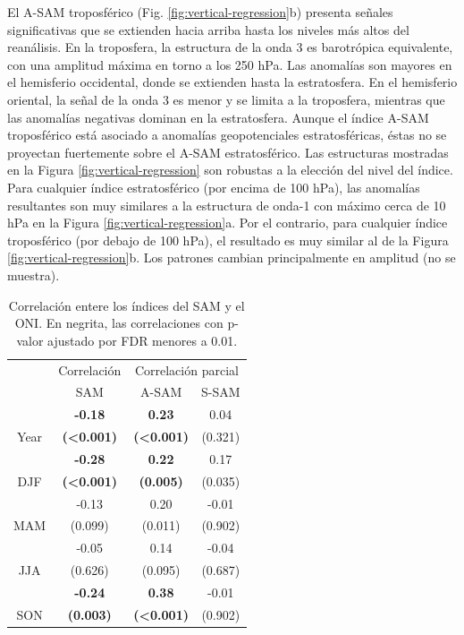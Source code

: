 \documentclass[12pt,oneside]{reedthesis}
\begin{document}
El A-SAM troposférico (Fig. \ref{fig:vertical-regression}b) presenta señales significativas que se extienden hacia arriba hasta los niveles más altos del reanálisis.
En la troposfera, la estructura de la onda 3 es barotrópica equivalente, con una amplitud máxima en torno a los 250 hPa.
Las anomalías son mayores en el hemisferio occidental, donde se extienden hasta la estratosfera.
En el hemisferio oriental, la señal de la onda 3 es menor y se limita a la troposfera, mientras que las anomalías negativas dominan en la estratosfera.
Aunque el índice A-SAM troposférico está asociado a anomalías geopotenciales estratosféricas, éstas no se proyectan fuertemente sobre el A-SAM estratosférico.
Las estructuras mostradas en la Figura \ref{fig:vertical-regression} son robustas a la elección del nivel del índice.
Para cualquier índice estratosférico (por encima de 100 hPa), las anomalías resultantes son muy similares a la estructura de onda-1 con máximo cerca de 10 hPa en la Figura \ref{fig:vertical-regression}a.
Por el contrario, para cualquier índice troposférico (por debajo de 100 hPa), el resultado es muy similar al de la Figura \ref{fig:vertical-regression}b.
Los patrones cambian principalmente en amplitud (no se muestra).




\begin{table}

\caption{\label{tab:enso-cor-table}Correlación entere los índices del SAM y el ONI.
En negrita, las correlaciones con p-valor ajustado por FDR menores a 0.01.}
\centering
\begin{tabular}[t]{c>{}c>{}c>{}c}
\toprule
\multicolumn{1}{c}{ } & \multicolumn{1}{c}{Correlación} & \multicolumn{2}{c}{Correlación parcial} \\
\cmidrule(l{3pt}r{3pt}){2-2} \cmidrule(l{3pt}r{3pt}){3-4}
 & SAM & A-SAM & S-SAM\\
\midrule
 & \textbf{-0.18} & \textbf{0.23} & 0.04\\
\cmidrule{2-4}
\multirow[t]{-2}{*}{\centering\arraybackslash Year} & \textbf{(<0.001)} & \textbf{(<0.001)} & (0.321)\\
\cmidrule{1-4}
 & \textbf{-0.28} & \textbf{0.22} & 0.17\\
\cmidrule{2-4}
\multirow[t]{-2}{*}{\centering\arraybackslash DJF} & \textbf{(<0.001)} & \textbf{(0.005)} & (0.035)\\
\cmidrule{1-4}
 & -0.13 & 0.20 & -0.01\\
\cmidrule{2-4}
\multirow[t]{-2}{*}{\centering\arraybackslash MAM} & (0.099) & (0.011) & (0.902)\\
\cmidrule{1-4}
 & -0.05 & 0.14 & -0.04\\
\cmidrule{2-4}
\multirow[t]{-2}{*}{\centering\arraybackslash JJA} & (0.626) & (0.095) & (0.687)\\
\cmidrule{1-4}
 & \textbf{-0.24} & \textbf{0.38} & -0.01\\
\cmidrule{2-4}
\multirow[t]{-2}{*}{\centering\arraybackslash SON} & \textbf{(0.003)} & \textbf{(<0.001)} & (0.902)\\
\bottomrule
\end{tabular}
\end{table}
\end{document}
